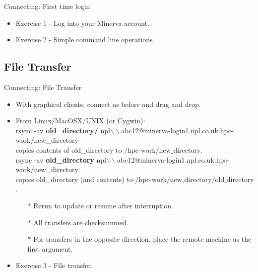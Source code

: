 \begin{frame}[fragile]{Connecting: First time login}
\begin{itemize}
\item{Exercise 1 - Log into your Minerva account.}
  \pause
  \item{Exercise 2 - Simple command line operations.}
\end{itemize}
\end{frame}

\subsection{File Transfer}
\begin{frame}{Connecting: File Transfer}
\begin{itemize}
\item With graphical clients, connect as before and drag and drop.
\pause
\item From Linux/MacOSX/UNIX (or Cygwin):\hfill\\
\alert{\footnotesize rsync -av \textbf{old\_directory/} npl$\backslash\backslash$abc12@minerva-login1.npl.co.uk:hpc-work/new\_directory}\hfill\\
copies contents of old\_directory to $\tilde{}\text{/hpc-work/new\_directory}$.\hfill\\\smallskip
\pause
\alert{\footnotesize rsync -av \textbf{old\_directory} npl$\backslash\backslash$abc12@minerva-login1.npl.co.uk:hpc-work/new\_directory}\hfill\\
copies old\_directory (and contents) to $\tilde{}\text{/hpc-work/new\_directory/old\_directory}$.\hfill\\
\pause
\begin{itemize}
\item[$\ast$]Rerun to update or resume after interruption.
\item[$\ast$]All transfers are checksummed.
\item[$\ast$]For transfers in the opposite direction, place the remote machine as the first argument.
\end{itemize}
\pause
\item{Exercise 3 - File transfer.}
\end{itemize}
\end{frame}

